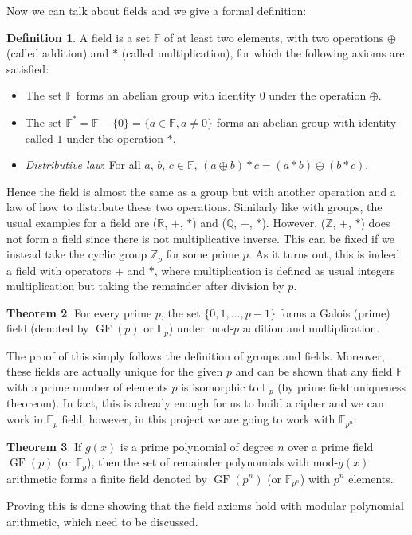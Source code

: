\documentclass{Resources/UoBLab1}
\theoremstyle{definition}
\newtheorem{theorem}{Theorem}[section]
\newtheorem{definition}[theorem]{Definition}
\begin{document}
Now we can talk about fields and we give a formal definition:
\begin{definition}
    A field is a set $\mathbb{F}$ of at least two elements, with two operations $\oplus$ (called addition) and $*$ (called multiplication), for which the following axioms are satisfied:
    \begin{itemize}
        \item The set $\mathbb{F}$ forms an abelian group with identity $0$ under the operation $\oplus$.
        \item The set $\mathbb{F}^* = \mathbb{F} - \{0\} = \{a \in \mathbb{F}, a \ne 0\}$ forms an abelian group with identity called $1$ under the operation $*$.
        \item \textit{Distributive law}: For all $a$, $b$, $c \in \mathbb{F}$, $(a \oplus b) * c = (a * b) \oplus (b * c)$.
    \end{itemize}
\end{definition}
Hence the field is almost the same as a group but with another operation and a law of how to distribute these two operations. Similarly like with groups, the usual examples for a field are ($\mathbb{R}$, $+$, $*$) and ($\mathbb{Q}$, $+$, $*$). However, ($\mathbb{Z}$, $+$, $*$) does not form a field since there is not multiplicative inverse. This can be fixed if we instead take the cyclic group $\mathbb{Z}_p$ for some prime $p$. As it turns out, this is indeed a field with operators $+$ and $*$, where multiplication is defined as usual integers multiplication but taking the remainder after division by $p$.
\begin{theorem}
    For every prime $p$, the set $\{0, 1, ... , p - 1\}$ forms a Galois (prime) field (denoted by $\operatorname{GF}(p)$ or $\mathbb{F}_p$) under mod-$p$ addition and multiplication.
\end{theorem}
The proof of this simply follows the definition of groups and fields\cite{FieldNotes}. Moreover, these fields are actually unique for the given $p$ and can be shown that any field $\mathbb{F}$ with a prime number of elements $p$ is isomorphic to $\mathbb{F}_p$ (by prime field uniqueness theoreom\cite{FieldNotes}). In fact, this is already enough for us to build a cipher and we can work in $\mathbb{F}_p$ field, however, in this project we are going to work with $\mathbb{F}_{p^n}$:
\begin{theorem}
    If $g(x)$ is a prime polynomial of degree $n$ over a prime field $\operatorname{GF}(p)$ (or $\mathbb{F}_p$), then the set of remainder polynomials with mod-$g(x)$ arithmetic forms a finite field denoted by $\operatorname{GF}(p^n)$ (or $\mathbb{F}_{p^n}$) with $p^n$ elements.
\end{theorem}
Proving this is done showing that the field axioms hold with modular polynomial arithmetic\cite{FieldNotes}, which need to be discussed.
\end{document}
